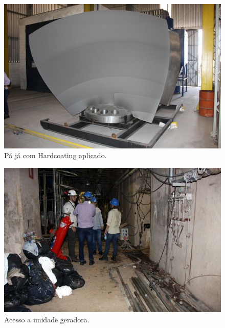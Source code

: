 \documentclass[a4paper,11pt,oneside,openany,brazilian,
version=last,draft=false,]{report}
\begin{document}
\begin{twocolumn}
\begin{figure}[H]
\centering
\includegraphics[width=\columnwidth]{Fotos/img_4886.jpg}
\caption{Pá já com Hardcoating aplicado.}
\label{fig:gull}
\end{figure}
\begin{figure}[H]
\centering
\includegraphics[width=\columnwidth]{Fotos/img_4905.jpg}
\caption{Acesso a unidade geradora.}
\end{figure}


% 


\end{twocolumn}
\end{document}
